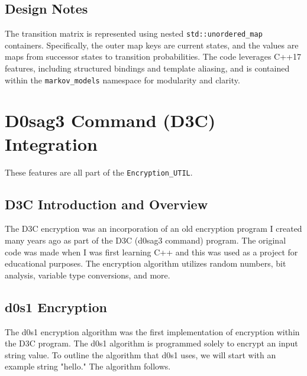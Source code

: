 \subsection{Design Notes}

The transition matrix is represented using nested \texttt{std::unordered\_map} containers. Specifically, the outer map keys are current states, and the values are maps from successor states to transition probabilities. The code leverages C++17 features, including structured bindings and template aliasing, and is contained within the \texttt{markov\_models} namespace for modularity and clarity.



















\section{D0sag3 Command (D3C) Integration} \label{D3C}

These features are all part of the \texttt{Encryption\_UTIL}.

\subsection{D3C Introduction and Overview}

The D3C encryption was an incorporation of an old encryption program I created many years ago as part of the D3C (d0sag3 command) program. The original code was made when I was first learning C++ and this was used as a project for educational purposes. The encryption algorithm utilizes random numbers, bit analysis, variable type conversions, and more. 

\subsection{d0s1 Encryption}

The d0s1 encryption algorithm was the first implementation of encryption within the D3C program. The d0s1 algorithm is programmed solely to encrypt an input string value. To outline the algorithm that d0s1 uses, we will start with an example string "hello." The algorithm follows.

